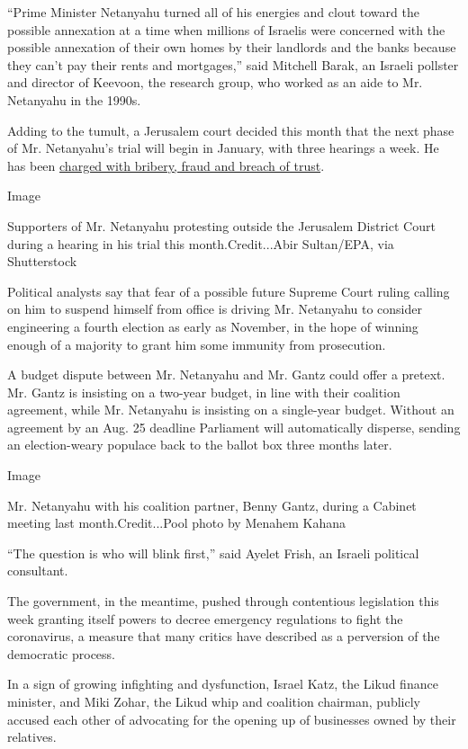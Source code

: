``Prime Minister Netanyahu turned all of his energies and clout toward
the possible annexation at a time when millions of Israelis were
concerned with the possible annexation of their own homes by their
landlords and the banks because they can't pay their rents and
mortgages,'' said Mitchell Barak, an Israeli pollster and director of
Keevoon, the research group, who worked as an aide to Mr. Netanyahu in
the 1990s.

Adding to the tumult, a Jerusalem court decided this month that the next
phase of Mr. Netanyahu's trial will begin in January, with three
hearings a week. He has been
\href{https://www.nytimes3xbfgragh.onion/2019/02/28/world/middleeast/benjamin-netanyahu-indictment.html?searchResultPosition=4}{charged
with bribery, fraud and breach of trust}.

Image

Supporters of Mr. Netanyahu protesting outside the Jerusalem District
Court during a hearing in his trial this month.Credit...Abir Sultan/EPA,
via Shutterstock

Political analysts say that fear of a possible future Supreme Court
ruling calling on him to suspend himself from office is driving Mr.
Netanyahu to consider engineering a fourth election as early as
November, in the hope of winning enough of a majority to grant him some
immunity from prosecution.

A budget dispute between Mr. Netanyahu and Mr. Gantz could offer a
pretext. Mr. Gantz is insisting on a two-year budget, in line with their
coalition agreement, while Mr. Netanyahu is insisting on a single-year
budget. Without an agreement by an Aug. 25 deadline Parliament will
automatically disperse, sending an election-weary populace back to the
ballot box three months later.

Image

Mr. Netanyahu with his coalition partner, Benny Gantz, during a Cabinet
meeting last month.Credit...Pool photo by Menahem Kahana

``The question is who will blink first,'' said Ayelet Frish, an Israeli
political consultant.

The government, in the meantime, pushed through contentious legislation
this week granting itself powers to decree emergency regulations to
fight the coronavirus, a measure that many critics have described as a
perversion of the democratic process.

In a sign of growing infighting and dysfunction, Israel Katz, the Likud
finance minister, and Miki Zohar, the Likud whip and coalition chairman,
publicly accused each other of advocating for the opening up of
businesses owned by their relatives.

